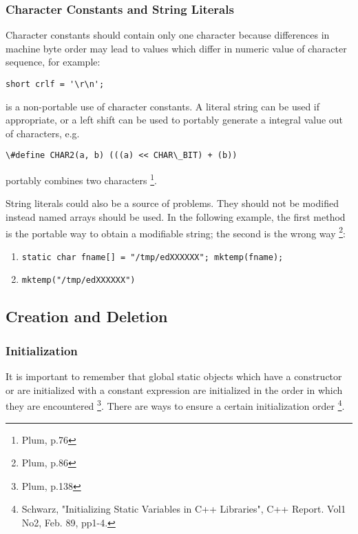 \subsubsection{Character Constants and String Literals}
Character constants should contain only one character because differences
in machine byte order may lead to values which differ in numeric value of
character sequence, for example:
\begin{verbatim}
short crlf = '\r\n';
\end{verbatim} 
\noindent
is a non-portable use of character constants. A literal string can be used
if appropriate, or a left shift can be used to portably generate a 
integral value out of characters, e.g. 
\begin{verbatim}
\#define CHAR2(a, b) (((a) << CHAR\_BIT) + (b))
\end{verbatim}
\noindent
portably combines two characters \footnote{Plum, p.76}.

String literals could also be a source of problems. They should not be 
modified instead named arrays should be used. In the following example,
the first method is the portable way to obtain a modifiable string; the
second is the wrong way \footnote{Plum, p.86}:

\begin{enumerate}
\item
\texttt{static char fname[] = "/tmp/edXXXXXX"; mktemp(fname);}
\item
\texttt{mktemp("/tmp/edXXXXXX")}
\end{enumerate}

\subsection{Creation and Deletion}

\subsubsection{Initialization}
It is important to remember that global static objects which have a constructor
or are initialized with a constant expression are initialized in the order
in which they are encountered \footnote{Plum, p.138}. There are ways to ensure
a certain initialization order \footnote{Schwarz, "Initializing Static
Variables in C++ Libraries", C++ Report. Vol1 No2, Feb. 89, pp1-4.}.

